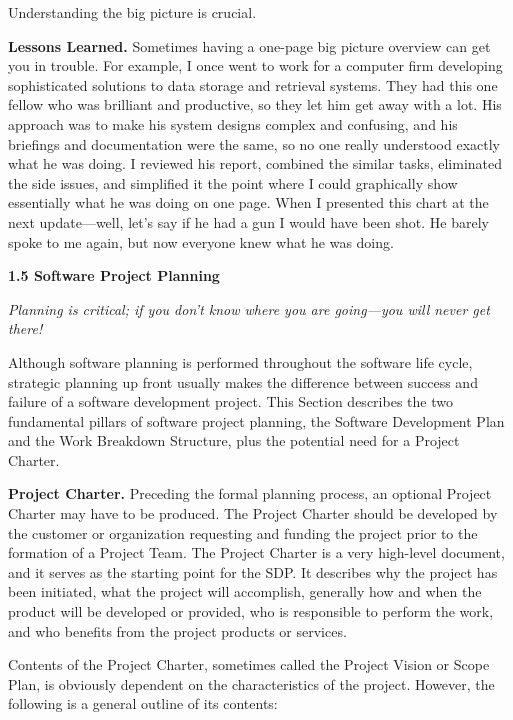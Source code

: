 \documentclass{book}
\begin{document}
\begin{multicols}{2}
Understanding the big picture is crucial.

\textbf{Lessons Learned.} Sometimes having a one-page
big picture overview can get you in trouble. For
example, I once went to work for a computer firm
developing sophisticated solutions to data storage
and retrieval systems. They had this one fellow
who was brilliant and productive, so they let him
get away with a lot. His approach was to make
his system designs complex and confusing, and
his briefings and documentation were the same,
so no one really understood exactly what he was
doing. I reviewed his report, combined the similar tasks, eliminated the side issues, and simplified it the point where I could graphically show
essentially what he was doing on one page. When
I presented this chart at the next update—well,
let’s say if he had a gun I would have been shot.
He barely spoke to me again, but now everyone
knew what he was doing.

\textbf{1.5 Software Project Planning}

\textit{Planning is critical; if you don’t know where you
are going—you will never get there!}

Although software planning is performed throughout
the software life cycle, strategic planning up front usually
makes the difference between success and failure of a software
development project. This Section describes the two fundamental pillars of software project planning, the Software
Development Plan and the Work Breakdown Structure, plus
the potential need for a Project Charter.

\textbf{Project Charter.} Preceding the formal planning process,
an optional Project Charter may have to be produced. The
Project Charter should be developed by the customer or organization requesting and funding the project prior to the formation of a Project Team. The Project Charter is a very high-level
document, and it serves as the starting point for the SDP. It
describes why the project has been initiated, what the project will accomplish, generally how and when the product will
be developed or provided, who is responsible to perform the
work, and who benefits from the project products or services.

Contents of the Project Charter, sometimes called the
Project Vision or Scope Plan, is obviously dependent on the
characteristics of the project. However, the following is a
general outline of its contents:


\end{multicols}
\end{document}
